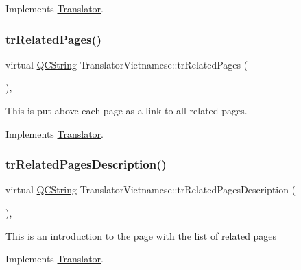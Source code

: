 Implements \mbox{\hyperlink{class_translator}{Translator}}.

\mbox{\label{class_translator_vietnamese_a5315c11d80b67d7295871062c0f1381a}} 
\subsubsection{\texorpdfstring{trRelatedPages()}{trRelatedPages()}}
{\footnotesize\ttfamily virtual \mbox{\hyperlink{class_q_c_string}{Q\+C\+String}} Translator\+Vietnamese\+::tr\+Related\+Pages (\begin{DoxyParamCaption}{ }\end{DoxyParamCaption})\hspace{0.3cm}{\ttfamily [inline]}, {\ttfamily [virtual]}}

This is put above each page as a link to all related pages. 

Implements \mbox{\hyperlink{class_translator}{Translator}}.

\mbox{\label{class_translator_vietnamese_a5af7d4809475efb4bf35124cac69cd87}} 
\subsubsection{\texorpdfstring{trRelatedPagesDescription()}{trRelatedPagesDescription()}}
{\footnotesize\ttfamily virtual \mbox{\hyperlink{class_q_c_string}{Q\+C\+String}} Translator\+Vietnamese\+::tr\+Related\+Pages\+Description (\begin{DoxyParamCaption}{ }\end{DoxyParamCaption})\hspace{0.3cm}{\ttfamily [inline]}, {\ttfamily [virtual]}}

This is an introduction to the page with the list of related pages 

Implements \mbox{\hyperlink{class_translator}{Translator}}.

\mbox{\label{class_translator_vietnamese_abe6594d7858039d1a55eee127eab219f}} 

